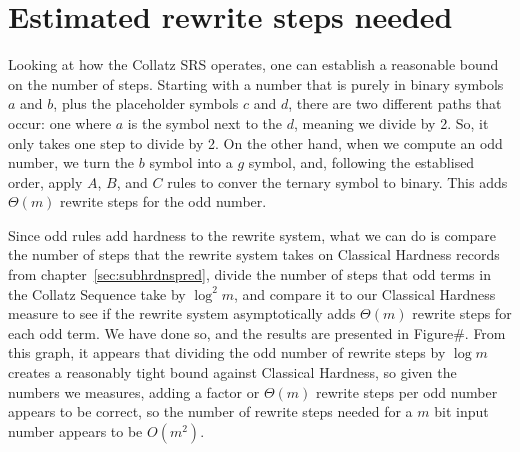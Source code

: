\section{Estimated rewrite steps needed} \label{subsec:estrwsteps}
Looking at how the Collatz SRS operates, one can establish a reasonable bound on the number of steps. Starting with a number that is purely in binary symbols $a$ and $b$, plus the placeholder symbols $c$ and $d$, there are two different paths that occur: one where $a$ is the symbol next to the $d$, meaning we divide by 2. So, it only takes one step to divide by 2. On the other hand, when we compute an odd number, we turn the $b$ symbol into a $g$ symbol, and, following the establised order, apply $A$, $B$, and $C$ rules to conver the ternary symbol to binary. This adds $\Theta(m)$ rewrite steps for the odd number. \par
Since odd rules add hardness to the rewrite system, what we can do is compare the number of steps that the rewrite system takes on Classical Hardness records from chapter~\ref{sec:subhrdnspred}, divide the number of steps that odd terms in the Collatz Sequence take by $\log^2{m}$, and compare it to our Classical Hardness measure to see if the rewrite system asymptotically adds $\Theta(m)$ rewrite steps for each odd term. We have done so, and the results are presented in Figure\#. From this graph, it appears that dividing the odd number of rewrite steps by $\log{m}$ creates a reasonably tight bound against Classical Hardness, so given the numbers we measures, adding a factor or $\Theta(m)$ rewrite steps per odd number appears to be correct, so the number of rewrite steps needed for a $m$ bit input number appears to be $O(m^2)$.


